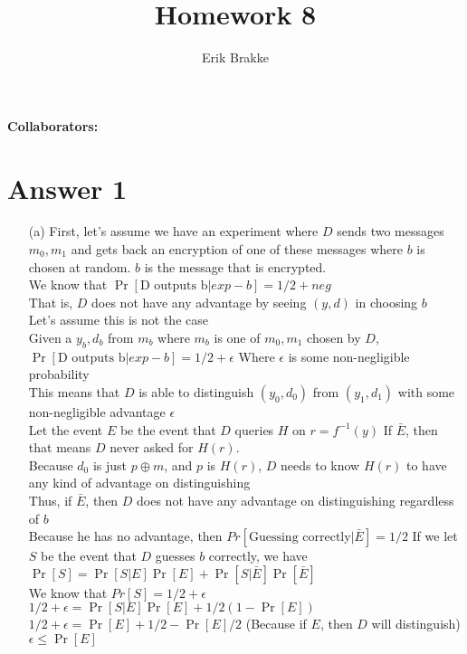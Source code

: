 \documentclass[11pt]{article}
\providecommand{\myparab}[1]{\smallskip\noindent\textbf{#1} }
\theoremstyle{definition}
\begin{document}
\title{Homework 8}
\author{Erik Brakke}
\maketitle

\thispagestyle{fancy}

\myparab{Collaborators: }
 
 
\section*{Answer 1}
\begin{enumerate}
	\item[(a)] First, let's assume we have an experiment where $D$ sends two messages $m_0,m_1$ and gets back an encryption of one of these messages where $b$ is chosen at random.  $b$ is the message that is encrypted.\\
We know that $\Pr[\text{D outputs b} | exp-b] = 1/2 + neg$\\
That is, $D$ does not have any advantage by seeing $(y,d)$ in choosing $b$\\
Let's assume this is not the case\\
Given a $y_b,d_b$ from $m_b$ where $m_b$ is one of $m_0,m_1$ chosen by $D$, $\Pr[\text{D outputs b}|exp-b] = 1/2 + \epsilon$ Where $\epsilon$ is some non-negligible probability\\
This means that $D$ is able to distinguish $(y_0,d_0)$ from $(y_1,d_1)$ with some non-negligible advantage $\epsilon$\\
Let the event $E$ be the event that $D$ queries $H$ on $r = f^{-1}(y)$
If $\bar{E}$, then that means $D$ never asked for $H(r)$.\\
Because $d_0$ is just $p \oplus m$, and $p$ is $H(r)$, $D$ needs to know $H(r)$ to have any kind of advantage on distinguishing\\
Thus, if $\bar{E}$, then $D$ does not have any advantage on distinguishing regardless of $b$\\
Because he has no advantage, then $Pr[\text{Guessing correctly} | \bar{E}] = 1/2$
If we let $S$ be the event that $D$ guesses $b$ correctly, we have $\Pr[S] = \Pr[S|E]\Pr[E] + \Pr[S|\bar{E}]\Pr[\bar{E}]$\\
We know that $Pr[S] = 1/2 + \epsilon$\\
$1/2 + \epsilon = \Pr[S|E]\Pr[E] + 1/2(1 - \Pr[E])$\\
$1/2 + \epsilon = \Pr[E] + 1/2 - \Pr[E]/2$ (Because if $E$, then $D$ will distinguish)\\
$\epsilon \le \Pr[E]$


\end{enumerate}
\end{document}
